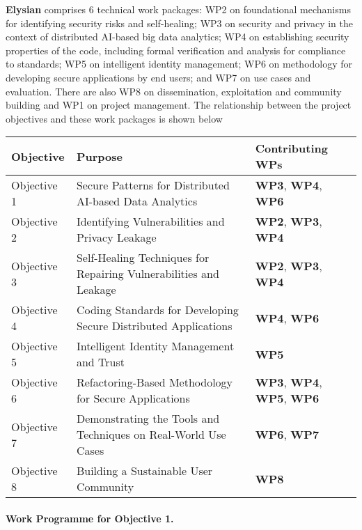 \documentclass[a4paper,11pt]{article}
\newcommand{\project}[1]{\textbf{#1}\xspace}
\newcommand{\SECURITY}{\project{Elysian}}
\newcommand{\TheProject}{\SECURITY}
\begin{document}
\TheProject{} comprises 6 technical work packages: WP2 on foundational mechanisms for identifying security risks and self-healing; WP3 on security and privacy in the context of distributed AI-based big data analytics; WP4 on establishing security properties of the code, including formal verification and analysis for compliance to standards; WP5 on intelligent identity management; WP6 on methodology for developing secure applications by end users; and WP7 on use cases and evaluation. There are also WP8 on dissemination, exploitation and community building and WP1 on project management. The relationship between the project objectives and these work packages is shown below

\vspace{-8pt}
\begin{center}
\begin{tabular}{|l|l|l|}\hline
\textbf{Objective} & \textbf{Purpose} & \textbf{Contributing WPs} \\\hline \hline
Objective 1 & Secure Patterns for Distributed AI-based Data Analytics & \textbf{WP3}, \textbf{WP4}, \textbf{WP6} \\\hline
Objective 2 & Identifying Vulnerabilities and Privacy Leakage & \textbf{WP2}, \textbf{WP3}, \textbf{WP4} \\\hline
Objective 3 & Self-Healing Techniques for Repairing Vulnerabilities and Leakage & \textbf{WP2}, \textbf{WP3}, \textbf{WP4} \\\hline
Objective 4 & Coding Standards for Developing Secure Distributed Applications & \textbf{WP4}, \textbf{WP6} \\\hline
Objective 5 & Intelligent Identity Management and Trust & \textbf{WP5} \\\hline
Objective 6 & Refactoring-Based Methodology for Secure Applications & \textbf{WP3}, \textbf{WP4}, \textbf{WP5}, \textbf{WP6} \\\hline
Objective 7 & Demonstrating the Tools and Techniques on Real-World Use Cases & \textbf{WP6}, \textbf{WP7}\\\hline
Objective 8 & Building a Sustainable User Community & \textbf{WP8}\\\hline
\end{tabular}
\end{center}

\paragraph*{Work Programme for Objective 1.}
\end{document}
